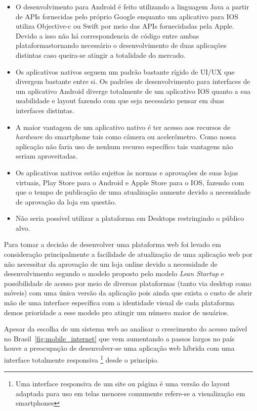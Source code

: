 \begin{itemize}
\item O desenvolvimento para Android é feito utilizando a linguagem Java a partir de APIs fornecidas pelo próprio Google enquanto um aplicativo para IOS utiliza Objective-c ou Swift por meio das APIs fornecidadas pela Apple. Devido a isso não há correspondencia de código entre ambas plataformastornando necessário o desenvolvimento de duas aplicações distintas caso queira-se atingir a totalidade do mercado.
\item Os aplicativos nativos seguem um padrão bastante rígido de UI/UX que divergem bastante entre si. Os padrões de desenvolvimento para interfaces  de um aplicativo Android diverge totalmente de um aplicativo IOS  quanto a sua usabilidade e layout fazendo com que seja necessário pensar em duas interfaces distintas.
\item A maior vantagem de um aplicativo nativo é ter acesso aos recursos de \emph{hardware} do smartphone tais como câmera ou acelerômetro. Como nossa aplicação não faria uso de nenhum recurso específico tais vantagens não seriam aproveitadas.
\item Os aplicativos nativos estão sujeitos às normas e aprovações de suas lojas virtuais, Play Store para  o Android e Apple Store para o IOS, fazendo com que o tempo de publicação de uma atualização  aumente devido a necessidade de aprovação da loja em questão.
\item Não seria possível utilizar a plataforma em Desktops restringindo o público alvo.
\end{itemize}
\par Para tomar a decisão de desenvolver uma plataforma web foi levado em consideração principalmente a facilidade de atualização de uma aplicação web por não necessitar da aprovação de um loja online devido a necessidade de desenvolvimento segundo o modelo proposto pelo modelo \emph{Lean Startup} e possibilidade de acesso por meio de diversas plataformas (tanto via desktop como móveis) com uma única versão da aplicação pois ainda que exista o custo de abrir mão de uma interface específica com a identidade visual de cada plataforma demos prioridade a esse modelo pro atingir um número maior de usuários.
\par Apesar da escolha de um sistema web ao analisar o crescimento do acesso móvel no Brasil~\ref{fig:mobile_internet} que vem aumentando a passos largos no país houve a preocupação de desenvolver-se uma aplicação web híbrida com uma interface totalmente responsiva \footnote{ Uma interface responsiva de um site ou página é uma versão do layout adaptada para uso em telas menores comumente refere-se a visualização em smartphones} desde o princípio.

